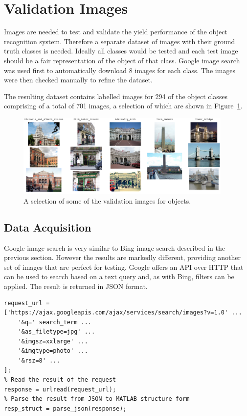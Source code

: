 \documentclass[11pt, onecolumn, a4paper, final]{report} %
\begin{document}
\section{Validation Images}
\label{sec:validationimages}

Images are needed to test and validate the yield performance of the object recognition system. Therefore a separate dataset of images with their ground truth classes is needed. Ideally all classes would be tested and each test image should be a fair representation of the object of that class. Google image search was used first to automatically download 8 images for each class. The images were then checked manually to refine the dataset.

The resulting dataset contains labelled images for 294 of the object classes comprising of a total of 701 images, a selection of which are shown in Figure~\ref{fig:validationimages}.

\begin{figure}[!h]
\centering
\includegraphics[width=0.95\textwidth]{images/validationimages.png}
\caption{A selection of some of the validation images for objects.}
\label{fig:validationimages}
\end{figure}

\subsection{Data Acquisition}

Google image search is very similar to Bing image search described in the previous section. However the results are markedly different, providing another set of images that are perfect for testing. Google offers an API over HTTP that can be used to search based on a text query and, as with Bing, filters can be applied. The result is returned in JSON format.

\linespread{1} %
\lstset{language=Matlab,caption=A Google image search API request.,label=lst:googleapi}
\begin{lstlisting}[frame=single]
%% MATLAB
request_url = ['https://ajax.googleapis.com/ajax/services/search/images?v=1.0' ...
	'&q=' search_term ...
	'&as_filetype=jpg' ...
	'&imgsz=xxlarge' ...
	'&imgtype=photo' ...
	'&rsz=8' ...
];
% Read the result of the request
response = urlread(request_url);
% Parse the result from JSON to MATLAB structure form
resp_struct = parse_json(response);
\end{lstlisting}
\linespread{2} %
\end{document}
